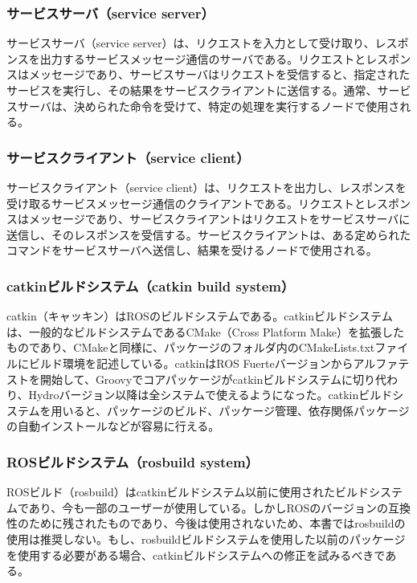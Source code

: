 \subsubsection{サービスサーバ（service server）}
サービスサーバ（service server）は、リクエストを入力として受け取り、レスポンスを出力するサービスメッセージ通信のサーバである。リクエストとレスポンスはメッセージであり、サービスサーバはリクエストを受信すると、指定されたサービスを実行し、その結果をサービスクライアントに送信する。通常、サービスサーバは、決められた命令を受けて、特定の処理を実行するノードで使用される。

\subsubsection{サービスクライアント（service client）}
サービスクライアント（service client）は、リクエストを出力し、レスポンスを受け取るサービスメッセージ通信のクライアントである。リクエストとレスポンスはメッセージであり、サービスクライアントはリクエストをサービスサーバに送信し、そのレスポンスを受信する。サービスクライアントは、ある定められたコマンドをサービスサーバへ送信し、結果を受けるノードで使用される。

\subsubsection{catkinビルドシステム（catkin build system）}
catkin（キャッキン）はROSのビルドシステムである。catkinビルドシステムは、一般的なビルドシステムであるCMake（Cross Platform Make）を拡張したものであり、CMakeと同様に、パッケージのフォルダ内のCMakeLists.txtファイルにビルド環境を記述している。catkinはROS Fuerteバージョンからアルファテストを開始して、Groovyでコアパッケージがcatkinビルドシステムに切り代わり、Hydroバージョン以降は全システムで使えるようになった。catkinビルドシステムを用いると、パッケージのビルド、パッケージ管理、依存関係パッケージの自動インストールなどが容易に行える。

\subsubsection{ROSビルドシステム（rosbuild system）}
ROSビルド（rosbuild）はcatkinビルドシステム以前に使用されたビルドシステムであり、今も一部のユーザーが使用している。しかしROSのバージョンの互換性のために残されたものであり、今後は使用されないため、本書ではrosbuildの使用は推奨しない。もし、rosbuildビルドシステムを使用した以前のパッケージを使用する必要がある場合、catkinビルドシステムへの修正を試みるべきである。


